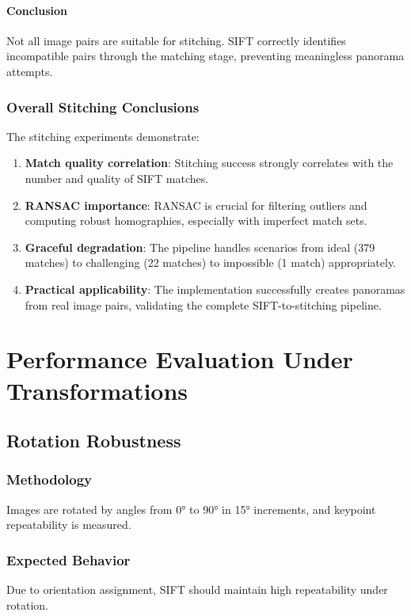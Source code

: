 \documentclass[12pt,a4paper]{article}
\begin{document}
\paragraph{Conclusion}
Not all image pairs are suitable for stitching. SIFT correctly identifies incompatible pairs through the matching stage, preventing meaningless panorama attempts.

\subsubsection{Overall Stitching Conclusions}
The stitching experiments demonstrate:

\begin{enumerate}
    \item \textbf{Match quality correlation}: Stitching success strongly correlates with the number and quality of SIFT matches.
    
    \item \textbf{RANSAC importance}: RANSAC is crucial for filtering outliers and computing robust homographies, especially with imperfect match sets.
    
    \item \textbf{Graceful degradation}: The pipeline handles scenarios from ideal (379 matches) to challenging (22 matches) to impossible (1 match) appropriately.
    
    \item \textbf{Practical applicability}: The implementation successfully creates panoramas from real image pairs, validating the complete SIFT-to-stitching pipeline.
\end{enumerate}

\section{Performance Evaluation Under Transformations}

\subsection{Rotation Robustness}

\subsubsection{Methodology}
Images are rotated by angles from 0° to 90° in 15° increments, and keypoint repeatability is measured.

\subsubsection{Expected Behavior}
Due to orientation assignment, SIFT should maintain high repeatability under rotation.
\end{document}
